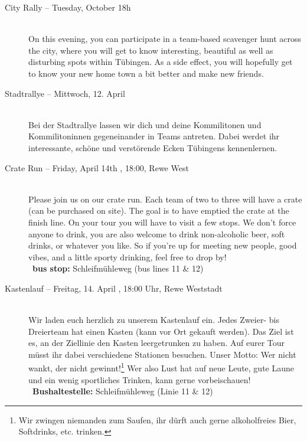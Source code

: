 \begin{description}
\ifml
	\item[City Rally -- Tuesday, October 18h \YEAR]~\\%
	On this evening, you can participate in a team-based scavenger hunt across the city,
	where you will get to know interesting, beautiful as well as disturbing spots within Tübingen.
	As a side effect, you will hopefully get to know your new home town a bit better and make new friends.
\else
	\item[Stadtrallye -- Mittwoch, 12. April \YEAR]~\\%
	Bei der Stadtrallye lassen wir dich und deine Kommilitonen und Kommilitoninnen gegeneinander in Teams antreten.
	Dabei werdet ihr interessante, schöne und verstörende Ecken Tübingens kennenlernen.
\fi


\ifml
\item[Crate Run -- Friday, April 14th \YEAR, 18:00, Rewe West]~\\
Please join us on our crate run.
Each team of two to three will have a crate (can be purchased on site).
The goal is to have emptied the crate at the finish line.
On your tour you will have to visit a few stops.
We don't force anyone to drink, you are also welcome to drink non-alcoholic beer, soft drinks, or whatever you like.
So if you're up for meeting new people, good vibes, and a little sporty drinking, feel free to drop by! \\
~\textbf{bus stop:} Schleifmühleweg (bus lines 11 \& 12)
\else
\item[Kastenlauf -- Freitag, 14. April \YEAR, 18:00 Uhr, Rewe Weststadt]~\\
Wir laden euch herzlich zu unserem Kastenlauf ein.
Jedes Zweier- bis Dreierteam hat einen Kasten (kann vor Ort gekauft werden).
Das Ziel ist es, an der Ziellinie den Kasten leergetrunken zu haben.
Auf eurer Tour müsst ihr dabei verschiedene Stationen besuchen.
Unser Motto: Wer nicht wankt, der nicht gewinnt!\footnote{Wir zwingen niemanden zum Saufen, ihr dürft auch gerne alkoholfreies Bier, Softdrinks, etc. trinken.}
Wer also Lust hat auf neue Leute, gute Laune und ein wenig sportliches Trinken, kann gerne vorbeischauen! \\
~\textbf{Bushaltestelle:} Schleifmühleweg (Linie 11 \& 12)
\fi


\end{description}
